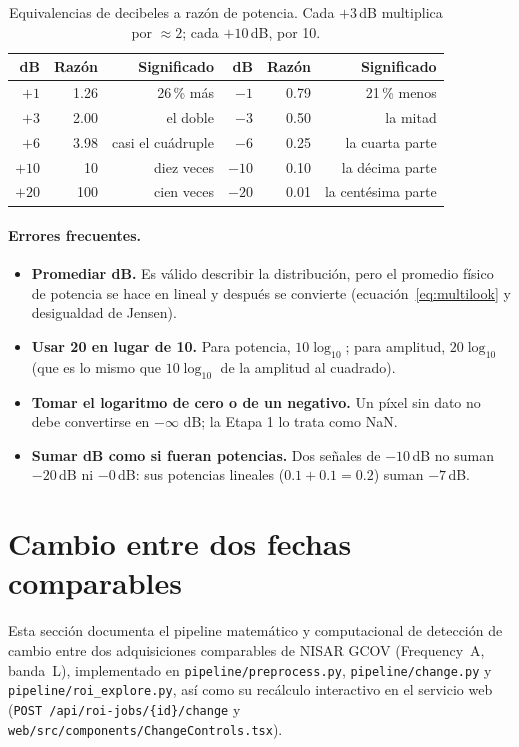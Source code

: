 \documentclass[11pt,a4paper]{article}
\newcommand{\src}[1]{\nolinkurl{#1}}
\begin{document}
\begin{table}[htbp]
\centering\small
\begin{tabular}{rrr|rrr}
\toprule
dB & Razón & Significado & dB & Razón & Significado\\\midrule
$+1$ & 1.26 & 26\,\% más & $-1$ & 0.79 & 21\,\% menos\\
$+3$ & 2.00 & el doble & $-3$ & 0.50 & la mitad\\
$+6$ & 3.98 & casi el cuádruple & $-6$ & 0.25 & la cuarta parte\\
$+10$ & 10 & diez veces & $-10$ & 0.10 & la décima parte\\
$+20$ & 100 & cien veces & $-20$ & 0.01 & la centésima parte\\\bottomrule
\end{tabular}
\caption{Equivalencias de decibeles a razón de potencia. Cada $+3$\,dB multiplica por $\approx2$; cada
$+10$\,dB, por 10.}
\label{tab:db-razon}
\end{table}

\paragraph{Errores frecuentes.}
\begin{itemize}
  \item \textbf{Promediar dB.} Es válido describir la distribución, pero el promedio físico de potencia se hace
        en lineal y después se convierte (ecuación~\eqref{eq:multilook} y desigualdad de Jensen).
  \item \textbf{Usar 20 en lugar de 10.} Para potencia, $10\log_{10}$; para amplitud, $20\log_{10}$ (que es lo
        mismo que $10\log_{10}$ de la amplitud al cuadrado).
  \item \textbf{Tomar el logaritmo de cero o de un negativo.} Un píxel sin dato no debe convertirse en $-\infty$
        dB; la Etapa 1 lo trata como NaN.
  \item \textbf{Sumar dB como si fueran potencias.} Dos señales de $-10$\,dB no suman $-20$\,dB ni $-0$\,dB: sus
        potencias lineales ($0.1+0.1=0.2$) suman $-7$\,dB.
\end{itemize}

\section{Cambio entre dos fechas comparables}
\label{sec:cambio}

Esta sección documenta el pipeline matemático y computacional de detección de cambio entre dos adquisiciones
comparables de NISAR GCOV (Frequency~A, banda~L), implementado en \src{pipeline/preprocess.py},
\src{pipeline/change.py} y \src{pipeline/roi_explore.py}, así como su recálculo interactivo en el servicio web
(\texttt{POST /api/roi-jobs/\{id\}/change} y \src{web/src/components/ChangeControls.tsx}).
\end{document}
